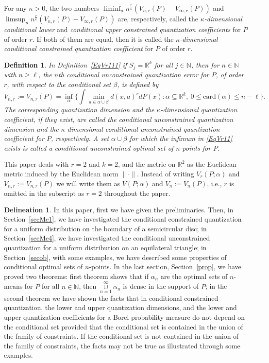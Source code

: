 \documentclass[12pt, reqno]{amsart}
\theoremstyle{plain}
\newtheorem{defi}[subsection]{Definition}
\theoremstyle{definition}
\newtheorem*{deli}{Delineation}
\newcommand{\uu}{\cup}%
\newcommand{\ci}{\subseteq}%
\newcommand{\ga}{\alpha}
\newcommand{\gb}{\beta}
\newcommand{\gk}{\kappa}
\newcommand{\tit}{\textit}%
\newcommand{\D}[1]{\mathbb{#1}}%
\begin{document}
 For any $\gk>0$, the two numbers $\liminf_n n^{\frac r \gk}  (V_{n, r}(P)-V_{\infty, r}(P))$ and $\limsup_n  n^{\frac r \gk}(V_{n, r}(P)-V_{\infty, r}(P))$ are, respectively, called the \tit{$\gk$-dimensional conditional lower} and \tit{conditional upper constrained quantization coefficients} for $P$ of order $r$. If both of them are equal, then it is called the \tit{$\gk$-dimensional conditional constrained quantization coefficient} for $P$ of order $r$.  

\begin{defi} 
In Definition~\ref{EqVr111} if $S_j=\D R^k$ for all $j\in \D N$, then  for $n\in \mathbb{N}$ with $n\geq \ell$, the \tit {$n$th conditional unconstrained quantization
error} for $P$, of order $r$, with respect to the conditional set $\gb$, is defined by 
\begin{equation}\label{EqVr11} 
V_{n, r}:=V_{n, r}(P)=\inf_{\ga} \Big\{\int \mathop{\min}\limits_{a\in\ga\uu\gb} d(x, a)^r dP(x) : \ga \ci \D R^k, ~ 0\leq  \text{card}(\ga) \leq n-\ell \Big\}.
\end{equation} 
The corresponding quantization dimension and the $\gk$-dimensional quantization coefficient, if they exist, are called the conditional unconstrained quantization dimension and the $\gk$-dimensional conditional unconstrained quantization coefficient for $P$, respectively. A set $\ga\uu \gb$ for which the infimum in \eqref{EqVr11} exists is called a conditional unconstrained optimal set of $n$-points for $P$. 
\end{defi} 

This paper deals with $r=2$ and $k=2$, and the metric on $\D R^2$ as the Euclidean metric induced by the Euclidean norm $\|\cdot\|$. Instead of writing $V_r(P; \ga)$ and $V_{n, r}:=V_{n, r}(P)$ we will write them as $V(P; \ga)$ and $V_n:=V_{n}(P)$, i.e., $r$ is omitted in the subscript as $r=2$ throughout the paper.

 

\begin{deli}
In this paper,  first we have given the preliminaries. Then, in Section~\ref{secMe1}, we have investigated the conditional constrained quantization for a uniform distribution on the boundary of a semicircular disc; in Section~\ref{secMe4}, we have investigated the conditional unconstrained quantization for a uniform distribution on an equilateral triangle; in Section~\ref{secob}, with some examples, we have described some properties of conditional optimal sets of $n$-points. In the last section, Section~\ref{prop}, we have proved two theorems: first theorem shows that if $\ga_n$ are the optimal sets of $n$-means for $P$ for all $n\in \D N$, then $\mathop{\uu}\limits_{n=1}^\infty \ga_n$ is dense in the support of $P$; in the second theorem we have shown the facts that in conditional constrained quantization, the lower and upper quantization dimensions, and the lower and upper quantization coefficients for a Borel probability measure do not depend on the conditional set provided that the conditional set is contained in the union of the family of constraints. If the conditional set is not contained in the union of the family of constraints, the facts may not be true as illustrated through some examples.  
\end{deli}
\end{document}
